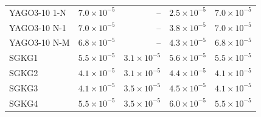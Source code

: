 \begin{tabular}{lrrrr}
YAGO3-10 1-N & $7.0\times10^{-5}$ & – & $2.5\times10^{-5}$ & $7.0\times10^{-5}$ \\
YAGO3-10 N-1 & $7.0\times10^{-5}$ & – & $3.8\times10^{-5}$ & $7.0\times10^{-5}$ \\
YAGO3-10 N-M & $6.8\times10^{-5}$ & – & $4.3\times10^{-5}$ & $6.8\times10^{-5}$ \\
\midrule
SGKG1 & $5.5\times10^{-5}$ & $3.1\times10^{-5}$ & $5.6\times10^{-5}$ & $5.5\times10^{-5}$ \\
SGKG2 & $4.1\times10^{-5}$ & $3.1\times10^{-5}$ & $4.4\times10^{-5}$ & $4.1\times10^{-5}$ \\
SGKG3 & $4.1\times10^{-5}$ & $3.5\times10^{-5}$ & $4.5\times10^{-5}$ & $4.1\times10^{-5}$ \\
SGKG4 & $5.5\times10^{-5}$ & $3.5\times10^{-5}$ & $6.0\times10^{-5}$ & $5.5\times10^{-5}$ \\
\bottomrule
\end{tabular}
